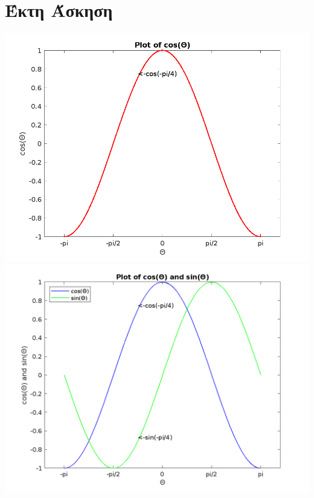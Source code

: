 \documentclass[a4paper,11pt]{article}
\begin{document}
		\section{Έκτη Άσκηση}
	\begin{center}
		\emph{\includegraphics[scale=0.75]{cosfun.png}}
		\emph{\includegraphics[scale=0.75]{cmb_fun.png}}
	\end{center}
	
	
	
\end{document}
